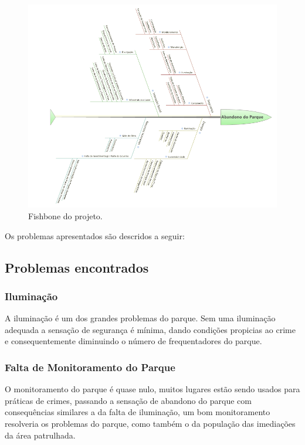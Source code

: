 \begin{figure}[H]
	\centering
	\label{FISHBONE}
		\includegraphics[keepaspectratio=true,scale=0.6]{figuras/FISHBONE_complete.png}
	\caption{Fishbone do projeto.}
\end{figure}

Os problemas apresentados s\~ao descridos a seguir:

\subsection{Problemas encontrados}
\subsubsection{Ilumina\c{c}\~ao}

A ilumina\c{c}\~ao \'e um dos grandes problemas do parque. Sem uma ilumina\c{c}\~ao adequada a sensa\c{c}\~ao de seguran\c{c}a \'e m\'inima, dando condi\c{c}\~oes propicias ao crime e consequentemente diminuindo o n\'umero de frequentadores do parque.

\subsubsection{Falta de Monitoramento do Parque}

O monitoramento do parque \'e quase nulo, muitos lugares estão sendo usados para pr\'aticas de crimes, passando a sensa\c{c}\~ao de abandono do parque com consequ\^encias similares a da falta de ilumina\c{c}\~ao, um bom monitoramento resolveria os problemas do parque, como tamb\'em o da popula\c{c}\~ao das imedia\c{c}\~oes da \'area patrulhada.

